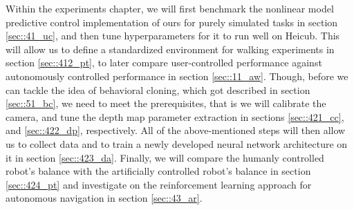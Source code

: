 \label{sec::9_ex}
Within the experiments chapter, we will first benchmark the nonlinear model predictive control implementation of ours for purely simulated tasks in section \ref{sec::41_uc}, and then tune hyperparameters for it to run well on Heicub. This will allow us to define a standardized environment for walking experiments in section \ref{sec::412_pt}, to later compare user-controlled performance against autonomously controlled performance in section \ref{sec::11_aw}. Though, before we can tackle the idea of behavioral cloning, which got described in section \ref{sec::51_bc}, we need to meet the prerequisites, that is we will calibrate the camera, and tune the depth map parameter extraction in sections \ref{sec::421_cc}, and \ref{sec::422_dp}, respectively. All of the above-mentioned steps will then allow us to collect data and to train a newly developed neural network architecture on it in section \ref{sec::423_da}. Finally, we will compare the humanly controlled robot's balance with the artificially controlled robot's balance in section \ref{sec::424_pt} and investigate on the reinforcement learning approach for autonomous navigation in section \ref{sec::43_ar}.